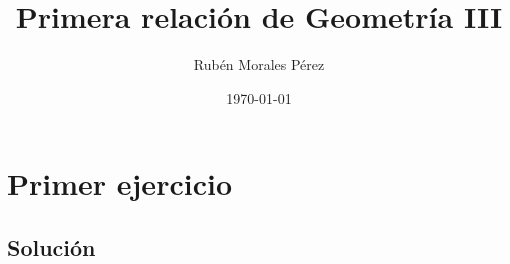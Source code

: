 \documentclass[11pt,spanish]{article} %
\title{Primera relaci\'on de Geometr\'ia III}
\author{Rubén Morales Pérez}
\date{\today}
\begin{document}
 
\maketitle
\tableofcontents %
\newpage
\setlength\parindent{0pt} %



\section{Primer ejercicio}

\subsection{Soluci\'on}






\end{document}
